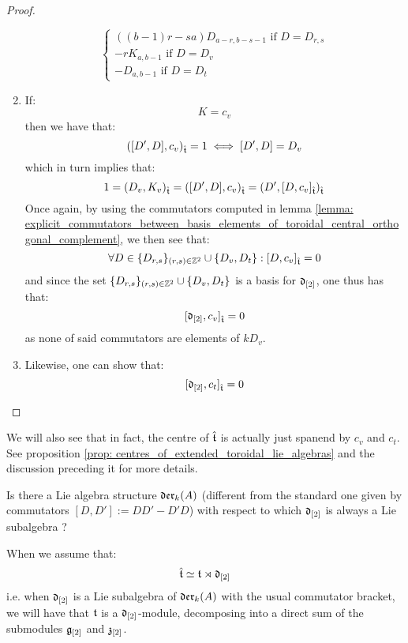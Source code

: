 \begin{proof}
\begin{enumerate}
$$\begin{cases}
                                \text{$((b - 1)r - sa) D_{a - r, b - s - 1}$ if $D = D_{r, s}$}
                                \\
                                \text{$-r K_{a, b - 1}$ if $D = D_v$}
                                \\
                                \text{$- D_{a, b - 1}$ if $D = D_t$}
                            \end{cases}
                        $$
                    \item If:
                        $$K = c_v$$
                    then we have that:
                        $$([D', D], c_v)_{\hat{\mathfrak{t}}} = 1 \iff [D', D] = D_v$$
                    which in turn implies that:
                        $$1 = (D_v, K_v)_{\hat{\mathfrak{t}}} = ([D', D], c_v)_{\hat{\mathfrak{t}}} = (D', [D, c_v]_{\hat{\mathfrak{t}}})_{\hat{\mathfrak{t}}}$$
                    Once again, by using the commutators computed in lemma \ref{lemma: explicit_commutators_between_basis_elements_of_toroidal_central_orthogonal_complement}, we then see that:
                        $$\forall D \in \{D_{r, s}\}_{(r, s) \in \mathbb{Z}^2} \cup \{D_v, D_t\}: [D, c_v]_{\hat{\mathfrak{t}}} = 0$$
                    and since the set $\{D_{r, s}\}_{(r, s) \in \mathbb{Z}^2} \cup \{D_v, D_t\}$ is a basis for $\mathfrak{d}_{[2]}$, one thus has that:
                        $$[\mathfrak{d}_{[2]}, c_v]_{\hat{\mathfrak{t}}} = 0$$
                    as none of said commutators are elements of $k D_v$.
                    \item Likewise, one can show that:
                        $$[\mathfrak{d}_{[2]}, c_t]_{\hat{\mathfrak{t}}} = 0$$
                \end{enumerate}
            \end{proof}
        We will also see that in fact, the centre of $\hat{\mathfrak{t}}$ is actually just spanend by $c_v$ and $c_t$. See proposition \ref{prop: centres_of_extended_toroidal_lie_algebras} and the discussion preceding it for more details. 
        
        \begin{question} \label{question: alternative_derivation_lie_bracket}
            Is there a Lie algebra structure $\mathfrak{der}_{k}(A)$ (different from the standard one given by commutators $[D, D'] := DD' - D'D$) with respect to which $\mathfrak{d}_{[2]}$ is always a Lie subalgebra ? 
        \end{question}
        
        \begin{proposition} \label{prop: toroidal_lie_algebras_as_modules_over_div_0_vector_field_lie_algebras}
            When we assume that:
                $$\hat{\mathfrak{t}} \simeq \mathfrak{t} \rtimes \mathfrak{d}_{[2]}$$
            i.e. when $\mathfrak{d}_{[2]}$ is a Lie subalgebra of $\mathfrak{der}_{k}(A)$ with the usual commutator bracket, we will have that $\mathfrak{t}$ is a $\mathfrak{d}_{[2]}$-module, decomposing into a direct sum of the submodules $\mathfrak{g}_{[2]}$ and $\mathfrak{z}_{[2]}$. 
        \end{proposition}
        
